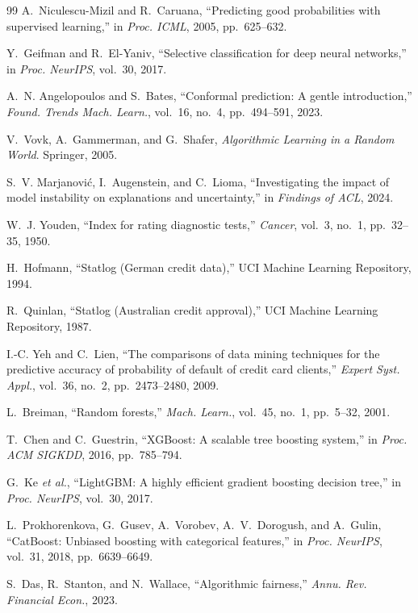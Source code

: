 \documentclass[journal]{IEEEtran}
\begin{document}
\begin{thebibliography}{99}
A.~Niculescu-Mizil and R.~Caruana, ``Predicting good probabilities with
supervised learning,'' in \emph{Proc. ICML}, 2005, pp.~625--632.

Y.~Geifman and R.~El-Yaniv, ``Selective classification for deep neural
networks,'' in \emph{Proc. NeurIPS}, vol.~30, 2017.

A.~N. Angelopoulos and S.~Bates, ``Conformal prediction: A gentle
introduction,'' \emph{Found. Trends Mach. Learn.}, vol.~16, no.~4,
pp.~494--591, 2023.

V.~Vovk, A.~Gammerman, and G.~Shafer, \emph{Algorithmic Learning in a Random
World}. Springer, 2005.

S.~V. Marjanovi\'c, I.~Augenstein, and C.~Lioma, ``Investigating the impact of
model instability on explanations and uncertainty,'' in \emph{Findings of
ACL}, 2024.

W.~J. Youden, ``Index for rating diagnostic tests,'' \emph{Cancer}, vol.~3,
no.~1, pp.~32--35, 1950.

H.~Hofmann, ``Statlog (German credit data),'' UCI Machine Learning Repository,
1994.

R.~Quinlan, ``Statlog (Australian credit approval),'' UCI Machine Learning
Repository, 1987.

I.-C. Yeh and C.~Lien, ``The comparisons of data mining techniques for the
predictive accuracy of probability of default of credit card clients,''
\emph{Expert Syst. Appl.}, vol.~36, no.~2, pp.~2473--2480, 2009.

L.~Breiman, ``Random forests,'' \emph{Mach. Learn.}, vol.~45, no.~1,
pp.~5--32, 2001.

T.~Chen and C.~Guestrin, ``XGBoost: A scalable tree boosting system,'' in
\emph{Proc. ACM SIGKDD}, 2016, pp.~785--794.

G.~Ke \emph{et al.}, ``LightGBM: A highly efficient gradient boosting decision
tree,'' in \emph{Proc. NeurIPS}, vol.~30, 2017.

L.~Prokhorenkova, G.~Gusev, A.~Vorobev, A.~V.~Dorogush, and A.~Gulin,
``CatBoost: Unbiased boosting with categorical features,'' in \emph{Proc.
NeurIPS}, vol.~31, 2018, pp.~6639--6649.

S.~Das, R.~Stanton, and N.~Wallace, ``Algorithmic fairness,'' \emph{Annu. Rev.
Financial Econ.}, 2023.

\end{thebibliography}
\end{document}
